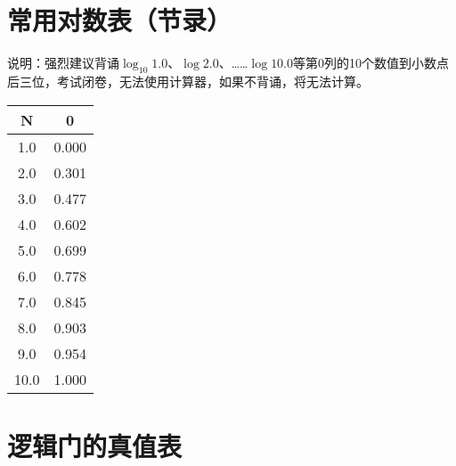 \section{常用对数表（节录）}

说明：强烈建议背诵$\log_{10} 1.0$、$\log 2.0$、……$\log 10.0$等第0列的10个数值到小数点后三位，考试闭卷，无法使用计算器，如果不背诵，将无法计算。

\begin{longtable}[c]{|c|c|}
    \hline
    \textbf{N} & \textbf{0} \\
    \hline
    \endhead
    \num{1.0} & \num{.000} \\ \hline
    \num{2.0} & \num{.301} \\ \hline
    \num{3.0} & \num{.477} \\ \hline
    \num{4.0} & \num{.602} \\ \hline
    \num{5.0} & \num{.699} \\ \hline
    \num{6.0} & \num{.778} \\ \hline
    \num{7.0} & \num{.845} \\ \hline
    \num{8.0} & \num{.903} \\ \hline
    \num{9.0} & \num{.954} \\ \hline
    \num{10.0} & \num{1.000} \\ \hline
\end{longtable}

\newpage








\section{逻辑门的真值表}


